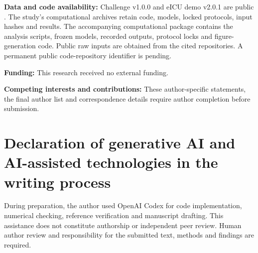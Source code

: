 \documentclass[preprint,12pt]{elsarticle}
\begin{document}
\textbf{Data and code availability:} Challenge v1.0.0 and eICU demo v2.0.1 are public \cite{reynadata,eicudemo}. The study's computational archives retain code, models, locked protocols, input hashes and results. The accompanying computational package contains the analysis scripts, frozen models, recorded outputs, protocol locks and figure-generation code. Public raw inputs are obtained from the cited repositories. A permanent public code-repository identifier is pending.

\textbf{Funding:} This research received no external funding.

\textbf{Competing interests and contributions:} These author-specific statements, the final author list and correspondence details require author completion before submission.

\section*{Declaration of generative AI and AI-assisted technologies in the writing process}
During preparation, the author used OpenAI Codex for code implementation, numerical checking, reference verification and manuscript drafting. This assistance does not constitute authorship or independent peer review. Human author review and responsibility for the submitted text, methods and findings are required.



\end{document}

